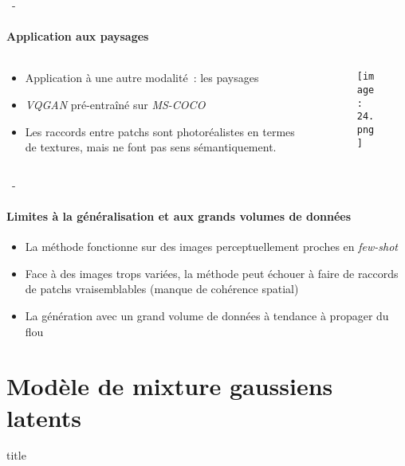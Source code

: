 \documentclass[aspectratio=169, 22pt]{beamer}
\begin{document}
\begin{frame}{\secname~- \subsecname}
  \framesubtitle{Application aux paysages}
  \begin{columns}
    \begin{column}{0.5\linewidth}
      \begin{itemize}
      \item Application à une autre modalité : les paysages
      \item \emph{VQGAN} pré-entraîné sur \emph{MS-COCO}
      \item Les raccords entre patchs sont photoréalistes en termes de
        textures, mais ne font pas sens sémantiquement.
      \end{itemize}
    \end{column}
    \begin{column}{0.5\linewidth}
      \begin{figure}
        \centering
        \texttt{[image: 24.png]}
      \end{figure}
    \end{column}
  \end{columns}  
\end{frame}

\begin{frame}{\secname~- \subsecname}
  \framesubtitle{Limites à la généralisation et aux grands volumes de données}
  \begin{itemize}
  \item La méthode fonctionne sur des images perceptuellement proches en \emph{few-shot}
  \item Face à des images trops variées, la méthode peut échouer à faire de raccords de patchs vraisemblables (manque de cohérence spatial)
  \item La génération avec un grand volume de données à tendance à propager du flou
  \end{itemize}
\end{frame}

\section{Modèle de mixture gaussiens latents}
\begin{frame}
  \begin{beamercolorbox}[sep=15pt,center,shadow=true,rounded=true]{title}
    \LARGE\bfseries \secname
  \end{beamercolorbox}
\end{frame}
\end{document}
